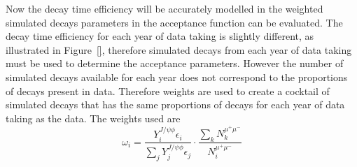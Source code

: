 Now the decay time efficiency will be accurately modelled in the weighted simulated \bsmumu decays parameters in the acceptance function can be evaluated. The decay time efficiency for each year of data taking is slightly different, as illustrated in Figure~\ref{}, therefore simulated decays from each year of data taking must be used to determine the acceptance parameters. However the number of simulated decays available for each year does not correspond to the proportions of decays present in data. Therefore weights are used to create a cocktail of simulated decays that has the same proportions of decays for each year of data taking as the data. The weights used are
\begin{equation}
\omega_{i}  = \frac{Y_{i}^{J/\psi \phi} \epsilon_{i}}{\displaystyle\sum_{j} Y_{j}^{J/\psi \phi} \epsilon_{j}} \cdot \frac{\displaystyle\sum_{k} N_{k}^{\mu^{+}\mu^{-}}}{N_{i}^{\mu^{+}\mu^{-}}}
\end{equation}
